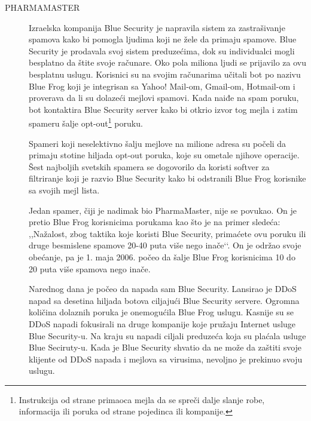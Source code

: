 \documentclass[a4paper]{article}
\theoremstyle{break}
\begin{document}
{\begin{description}
\item[PHARMAMASTER] Izraelska kompanija Blue Security je napravila sistem za zastrašivanje spamova kako bi pomogla ljudima koji ne žele da primaju spamove. Blue Security je prodavala svoj sistem preduzećima, dok su individualci mogli besplatno da štite svoje računare. Oko pola miliona ljudi se prijavilo za ovu besplatnu uslugu. Korisnici su na svojim računarima učitali bot po nazivu Blue Frog koji je integrisan sa Yahoo! Mail-om, Gmail-om, Hotmail-om i proverava da li su dolazeći mejlovi spamovi. Kada naiđe na spam poruku, bot kontaktira Blue Security server kako bi otkrio izvor tog mejla i zatim spameru šalje opt-out\footnote{Instrukcija od strane primaoca mejla da se spreči dalje slanje robe, informacija ili poruka od strane pojedinca ili kompanije.} poruku.

Spameri koji neselektivno šalju mejlove na milione adresa su počeli da primaju stotine hiljada opt-out poruka, koje su ometale njihove operacije. Šest najboljih svetskih spamera se dogovorilo da koristi softver za filtriranje koji je razvio Blue Security kako bi odstranili Blue Frog korisnike sa svojih mejl lista.

Jedan spamer, čiji je nadimak bio PharmaMaster, nije se povukao. On je pretio Blue Frog korisnicima porukama kao što je na primer sledeća: ,,Nažalost, zbog taktika koje koristi Blue Security, primaćete ovu poruku ili druge besmislene spamove 20-40 puta više nego inače‘‘. On je održao svoje obećanje, pa je 1. maja 2006. počeo da šalje Blue Frog korisnicima 10 do 20 puta više spamova nego inače.

Narednog dana je počeo da napada sam Blue Security. Lansirao je DDoS napad sa desetina hiljada botova ciljajući Blue Security servere. Ogromna količina dolaznih poruka je onemogućila Blue Frog uslugu. Kasnije su se DDoS napadi fokusirali na druge kompanije koje pružaju Internet usluge Blue Security-u. Na kraju su napadi ciljali preduzeća koja su plaćala usluge Blue Seciruty-u. Kada je Blue Security shvatio da ne može da zaštiti svoje klijente od DDoS napada i mejlova sa virusima, nevoljno je prekinuo svoju uslugu.




\end{description}}
\end{document}

